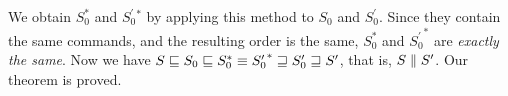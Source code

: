 We obtain \(S_0^*\) and \(S^\prime_0^*\) by applying this method to \(S_0\) and
\(S^\prime_0\). Since they contain the same
commands, and the resulting order is the same,
\(S_0^*\) and
\({S^\prime_0}^*\) are \emph{exactly the same}. Now we have
\(S\sqsubseteq S_0\sqsubseteq S_0^*\equiv{S^\prime_0}^*\sqsupseteq S^\prime_0\sqsupseteq
S^\prime\), that is, \(S\parallel S^\prime\). Our theorem is proved.


